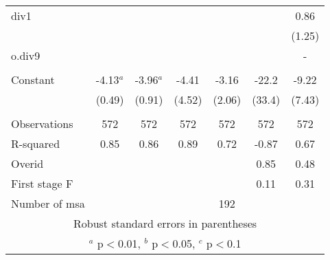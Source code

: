 \documentclass[]{article}
\begin{document}
\begin{tabular}{lcccccc}
div1 &  &  &  &  &  & 0.86 \\
 &  &  &  &  &  & (1.25) \\
o.div9 &  &  &  &  &  & - \\
 &  &  &  &  &  &  \\
Constant & -4.13$^a$ & -3.96$^a$ & -4.41 & -3.16 & -22.2 & -9.22 \\
 & (0.49) & (0.91) & (4.52) & (2.06) & (33.4) & (7.43) \\
 &  &  &  &  &  &  \\
Observations & 572 & 572 & 572 & 572 & 572 & 572 \\
R-squared & 0.85 & 0.86 & 0.89 & 0.72 & -0.87 & 0.67 \\
Overid &  &  &  &  & 0.85 & 0.48 \\
First stage F &  &  &  &  & 0.11 & 0.31 \\
 Number of msa &  &  &  & 192 &  &  \\ \hline
\multicolumn{7}{c}{ Robust standard errors in parentheses} \\
\multicolumn{7}{c}{ $^a$ p$<$0.01, $^b$ p$<$0.05, $^c$ p$<$0.1} \\
\end{tabular}
\end{document}

